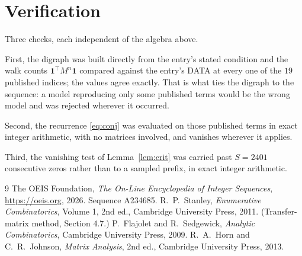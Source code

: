 \documentclass[11pt,a4paper]{article}
\theoremstyle{plain}
\theoremstyle{definition}
\begin{document}
\section{Verification}

Three checks, each independent of the algebra above.

First, the digraph was built directly from the entry's stated condition and the walk counts
$\mathbf{1}^{\!\top}M^{n}\mathbf{1}$ compared against the entry's DATA at every one of
the $19$ published indices; the values agree exactly. That is what ties the digraph to
the sequence: a model reproducing only some published terms would be the wrong model and
was rejected wherever it occurred.

Second, the recurrence \eqref{eq:conj} was evaluated on those published terms in exact
integer arithmetic, with no matrices involved, and vanishes wherever it applies.

Third, the vanishing test of Lemma~\ref{lem:crit} was carried past $S=2401$ consecutive
zeros rather than to a sampled prefix, in exact integer arithmetic.

\begin{thebibliography}{9}
 The OEIS Foundation, \emph{The On-Line Encyclopedia of Integer
Sequences}, \url{https://oeis.org}, 2026. Sequence A234685.
 R.~P.~Stanley, \emph{Enumerative Combinatorics}, Volume 1, 2nd ed.,
Cambridge University Press, 2011. (Transfer-matrix method, Section 4.7.)
 P.~Flajolet and R.~Sedgewick, \emph{Analytic Combinatorics}, Cambridge
University Press, 2009.
 R.~A.~Horn and C.~R.~Johnson, \emph{Matrix Analysis}, 2nd ed., Cambridge
University Press, 2013.
\end{thebibliography}
\end{document}
